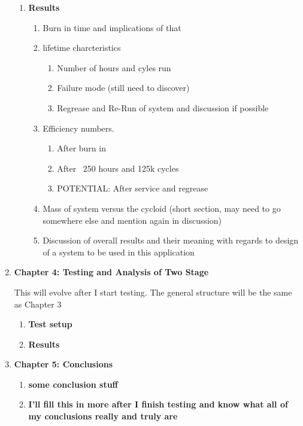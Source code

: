 \begin{enumerate}
\begin{enumerate}
		\item \textbf{Results}
		\begin{enumerate}
			\item
			Burn in time and implications of that 
			\item 
			lifetime charcteristics
			\begin{enumerate}
				\item
				Number of hours and cyles run
				\item
				Failure mode (still need to discover) 
				\item
				Regrease and Re-Run of system and discussion if possible 
			\end{enumerate}
			\item
			Efficiency numbers.
			\begin{enumerate}
				\item
				After burn in 
				\item
				After ~250 hours and 125k cycles 
				\item
				POTENTIAL: After service and regrease 
			\end{enumerate}
			\item
			Mass of system versus the cycloid (short section, may need to go somewhere else and mention again in discussion)
			\item
			Discussion of overall results and their meaning with regards to design of a system to be used in this application 
		\end{enumerate}
	\end{enumerate}

	\item \textbf{Chapter 4: Testing and Analysis of Two Stage}
	
	This will evolve after I start testing. The general structure will be the same as Chapter 3
	\begin{enumerate}
		\item \textbf{Test setup}
		\item \textbf{Results}
	\end{enumerate}


	\item \textbf{Chapter 5: Conclusions}
	\begin{enumerate}
		\item \textbf{some conclusion stuff}
		\item \textbf{I'll fill this in more after I finish testing and know what all of my conclusions really and truly are}
	\end{enumerate}
\end{enumerate}
